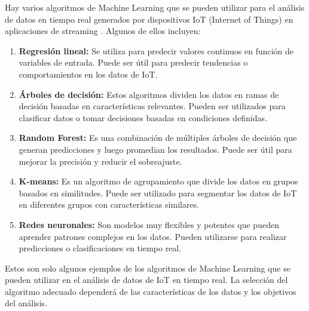 \documentclass[12pt]{article}
\begin{document}
Hay varios algoritmos de Machine Learning que se pueden utilizar para el análisis de datos en tiempo real generados por dispositivos IoT (Internet of Things) en aplicaciones de streaming \citep{ref51}. Algunos de ellos incluyen:
\begin{enumerate}
    \item {
       
    \textbf{Regresión lineal:} Se utiliza para predecir valores continuos en función de variables de entrada. Puede ser útil para predecir tendencias o comportamientos en los datos de IoT.
        }
    \item {
    
    \textbf{Árboles de decisión:} Estos algoritmos dividen los datos en ramas de decisión basadas en características relevantes. Pueden ser utilizados para clasificar datos o tomar decisiones basadas en condiciones definidas.
        }
    \item {
        \textbf{Random Forest:} Es una combinación de múltiples árboles de decisión que generan predicciones y luego promedian los resultados. Puede ser útil para mejorar la precisión y reducir el sobreajuste.
        }
    \item{
        \textbf{K-means:} Es un algoritmo de agrupamiento que divide los datos en grupos basados en similitudes. Puede ser utilizado para segmentar los datos de IoT en diferentes grupos con características similares.
        }
    \item{
        \textbf{Redes neuronales:} Son modelos muy flexibles y potentes que pueden aprender patrones complejos en los datos. Pueden utilizarse para realizar predicciones o clasificaciones en tiempo real.
    }
        
\end{enumerate}

Estos son solo algunos ejemplos de los algoritmos de Machine Learning que se pueden utilizar en el análisis de datos de IoT en tiempo real. La selección del algoritmo adecuado dependerá de las características de los datos y los objetivos del análisis.
\end{document}
